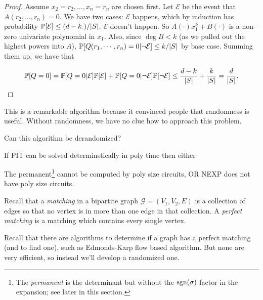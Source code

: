\documentclass[11 pt]{scrartcl}
\begin{document}
\begin{example}
\begin{proof}
        Assume $x_2 = r_2, \dots, x_n = r_n$ are chosen first. Let $\mathcal{E}$ be the event that $A(r_2, \dots, r_n) = 0$. We have two cases: 
        \alphanum
            \ii $\mathcal{E}$ happens, which by induction has probability $\mathbb P[\mathcal{E}]\leq (d-k. )/|S|$. 
            \ii $\mathcal{E}$ doesn't happen. So $A(\cdot)x_1^k + B(\cdot)$ is a non-zero univariate polynomial in $x_1$. Also, since $\deg B < k$ (as we pulled out the highest powers into $A$), $\mathbb P[Q(r_1, \cdots, r_n) = 0 | \neg \mathcal{E}] \leq k/|S|$ by base case.  
        \enumend
        Summing them up, we have that

        \[ \mathbb P[Q = 0] = \mathbb P[Q = 0 | \mathcal{E}]\mathbb P[\mathcal{E}] + \mathbb P[Q = 0 | \neg \mathcal{E}]\mathbb P[\neg\mathcal{E}] \leq \dfrac{d-k}{|S|} + \dfrac{k}{|S|} = \dfrac{d}{|S|}.\] 
    \end{proof}

\end{example}

    This is a remarkable algorithm because it convinced people that randomness is useful. Without randomness, we have no clue how to approach this problem.   

\begin{question}
    Can this algorithm be derandomized? 
\end{question}
\begin{theorem}[Impagliazzo-?]
    If PIT can be solved determinstically in poly time then either 
    \begin{enumerate}[(1)]
        \ii The permanent\footnote{The \emph{permanent} is the determinant but without the $\text{sgn}(\sigma)$ factor in the expansion; see later in this section.} cannot be computed by poly size circuits, OR
        \ii NEXP does not have poly size circuits.  
    \end{enumerate}
\end{theorem}

Recall that a \emph{matching} in a bipartite graph $\mathcal{G} = (V_1, V_2, E)$ is a collection of edges so that no vertex is in more than one edge in that collection. A \emph{perfect matching} is a matching which contains every single vertex. 

Recall that there are algorithms to determine if a graph has a perfect matching (and to find one), such as Edmonds-Karp flow based algorithm. But none are very efficient, so instead we'll develop a randomized one. 
\end{document}
